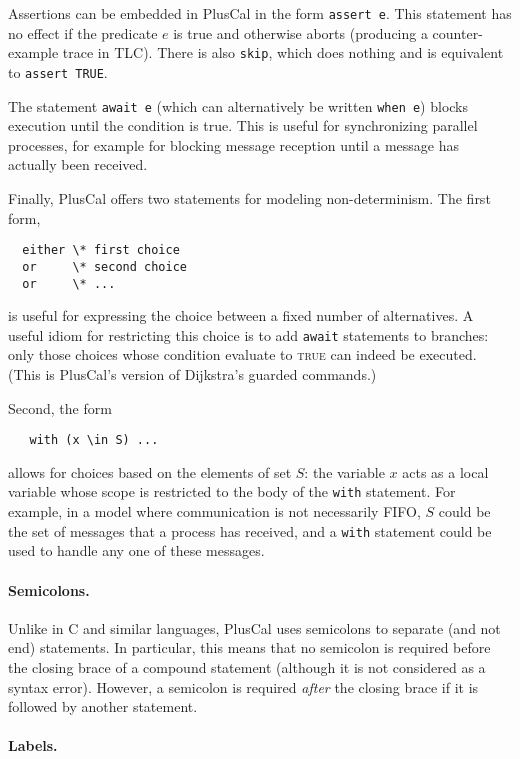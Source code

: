 \documentclass[11pt,fleqn]{article}
\newcommand{\kw}[1]{\textnormal{\textsc{#1}}}
\newcommand{\TRUE}{\kw{true}}
\begin{document}
Assertions can be embedded in PlusCal in the form \verb|assert e|. This
statement has no effect if the predicate $e$ is true and otherwise aborts
(producing a counter-example trace in TLC). There is also \verb|skip|, which
does nothing and is equivalent to \verb|assert TRUE|.

The statement \verb|await e| (which can alternatively be written \verb|when e|)
blocks execution until the condition is true. This is useful for synchronizing
parallel processes, for example for blocking message reception until a message
has actually been received.

Finally, PlusCal offers two statements for modeling non-determinism. The first
form,
%
\begin{verbatim}
  either \* first choice
  or     \* second choice
  or     \* ...
\end{verbatim}
%
is useful for expressing the choice between a fixed number of alternatives. A
useful idiom for restricting this choice is to add \verb|await| statements to
branches: only those choices whose condition evaluate to \TRUE{} can indeed be
executed. (This is PlusCal's version of Dijkstra's guarded commands.)

Second, the form
%
\begin{verbatim}
   with (x \in S) ...
\end{verbatim}
%
allows for choices based on the elements of set $S$: the variable $x$ acts as a
local variable whose scope is restricted to the body of the \verb|with|
statement. For example, in a model where communication is not necessarily FIFO,
$S$ could be the set of messages that a process has received, and a \verb|with|
statement could be used to handle any one of these messages.

\paragraph{Semicolons.}

Unlike in C and similar languages, PlusCal uses semicolons to separate (and not
end) statements. In particular, this means that no semicolon is required before
the closing brace of a compound statement (although it is not considered as a
syntax error). However, a semicolon is required \emph{after} the closing brace
if it is followed by another statement.

\paragraph{Labels.}
\end{document}
